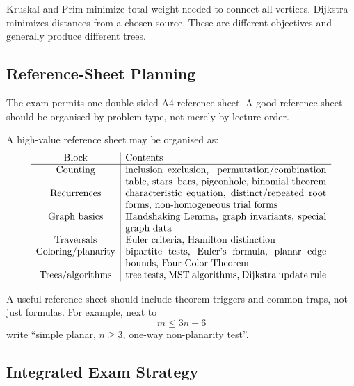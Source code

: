 \begin{commonmistake}[title={MST versus shortest path}]
Kruskal and Prim minimize total weight needed to connect all vertices. Dijkstra minimizes distances from a chosen source. These are different objectives and generally produce different trees.
\end{commonmistake}

\subsection{Reference-Sheet Planning}

The exam permits one double-sided A4 reference sheet. A good reference sheet should be organised by problem type, not merely by lecture order.

\begin{examtip}[title={Suggested reference-sheet layout}]
A high-value reference sheet may be organised as:
\[
\begin{array}{c|p{0.60\textwidth}}
\text{Block} & \text{Contents} \\ \hline
\text{Counting} & inclusion--exclusion, permutation/combination table, stars--bars, pigeonhole, binomial theorem \\
\text{Recurrences} & characteristic equation, distinct/repeated root forms, non-homogeneous trial forms \\
\text{Graph basics} & Handshaking Lemma, graph invariants, special graph data \\
\text{Traversals} & Euler criteria, Hamilton distinction \\
\text{Coloring/planarity} & bipartite tests, Euler's formula, planar edge bounds, Four-Color Theorem \\
\text{Trees/algorithms} & tree tests, MST algorithms, Dijkstra update rule
\end{array}
\]
\end{examtip}

\begin{commonmistake}[title={Reference sheet too formula-heavy}]
A useful reference sheet should include theorem triggers and common traps, not just formulas. For example, next to
\[
m\le 3n-6
\]
write ``simple planar, \(n\ge3\), one-way non-planarity test''.
\end{commonmistake}

\subsection{Integrated Exam Strategy}

